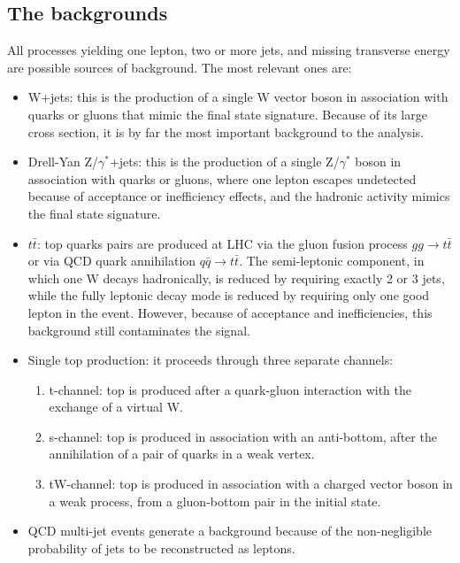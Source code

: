 \subsection {The backgrounds}
All processes yielding one lepton, two or more jets, 
and missing transverse energy are possible sources 
of background. The most relevant ones are:
\begin{itemize}
  \item W+jets: this is the production of a single W vector boson 
        in association with quarks or gluons that mimic the final state 
        signature. 
        Because of its large cross section, it is by far the most important 
	background to the analysis.
  \item Drell-Yan Z/$\gamma^{*}$+jets: this is the production of 
        a single Z/$\gamma^{*}$ boson in association with quarks or gluons, 
	where one lepton escapes undetected because of acceptance or 
        inefficiency effects, and the hadronic activity mimics the final 
	 state signature.
  \item $t\bar{t}$: top quarks pairs are produced at LHC via the gluon fusion process
              $gg\to{}t\bar{t}$ or via QCD quark annihilation $q\bar{q}\to{}t\bar{t}$.
              The semi-leptonic component, in which one W decays hadronically,
              is reduced by requiring exactly 2 or 3 jets,
              while the fully leptonic decay mode is reduced by requiring only 
	      one good lepton in the event.
              However, because of acceptance and inefficiencies, 
              this background still contaminates the signal.
  \item Single top production: it proceeds through three separate channels:
       \begin{enumerate}
         \item t-channel: top is produced after a quark-gluon interaction 
               with the exchange of a virtual W.
         \item s-channel: top is produced in association with an anti-bottom, 
               after the annihilation of a pair of quarks in a weak vertex.
         \item tW-channel: top is produced in association with a charged vector boson in a weak process, 
               from a gluon-bottom pair in the initial state.
       \end{enumerate}
  \item QCD multi-jet events generate a background 
       because of the non-negligible probability of jets to be reconstructed as leptons.
\end{itemize}
